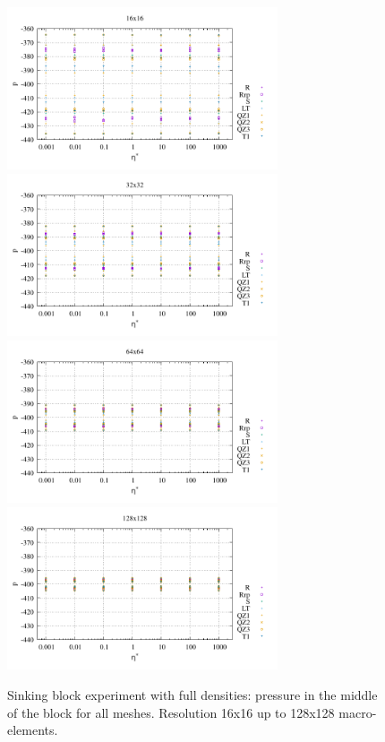\documentclass[a4paper,12pt]{article}
\begin{document}
\begin{figure}[t]
\centering
\includegraphics[width=8cm]{../results/exp08/p_block_res16.pdf}
\includegraphics[width=8cm]{../results/exp08/p_block_res32.pdf}\\
\includegraphics[width=8cm]{../results/exp08/p_block_res64.pdf}
\includegraphics[width=8cm]{../results/exp08/p_block_res128.pdf}
\caption{Sinking block experiment with full densities:  pressure in the middle
of the block for all meshes. Resolution 16x16 up to 128x128 macro-elements.  \label{fig:block3}}
\end{figure}


\end{document}
